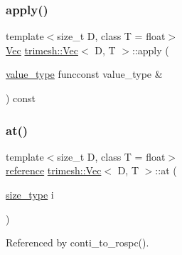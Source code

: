 \mbox{\label{classtrimesh_1_1Vec_ab0c9934c8f265e9a70064eecb09b7951}} 
\subsubsection{\texorpdfstring{apply()}{apply()}\hspace{0.1cm}{\footnotesize\ttfamily [2/2]}}
{\footnotesize\ttfamily template$<$size\+\_\+t D, class T = float$>$ \\
\hyperlink{classtrimesh_1_1Vec}{Vec} \hyperlink{classtrimesh_1_1Vec}{trimesh\+::\+Vec}$<$ D, T $>$\+::apply (\begin{DoxyParamCaption}\item[{\hyperlink{classtrimesh_1_1Vec_a10a59253996e42d67c713f37592669df}{value\+\_\+type} }]{funcconst value\+\_\+type \& }\end{DoxyParamCaption}) const\hspace{0.3cm}{\ttfamily [inline]}}

\mbox{\label{classtrimesh_1_1Vec_a51378784c1e7f96e6ce170620ccaacc6}} 
\subsubsection{\texorpdfstring{at()}{at()}\hspace{0.1cm}{\footnotesize\ttfamily [1/2]}}
{\footnotesize\ttfamily template$<$size\+\_\+t D, class T = float$>$ \\
\hyperlink{classtrimesh_1_1Vec_ad76bb92c986524d251998d6eae7d2825}{reference} \hyperlink{classtrimesh_1_1Vec}{trimesh\+::\+Vec}$<$ D, T $>$\+::at (\begin{DoxyParamCaption}\item[{\hyperlink{classtrimesh_1_1Vec_a65397e05ed96e7723cf2d54dfff0ad0a}{size\+\_\+type}}]{i }\end{DoxyParamCaption})\hspace{0.3cm}{\ttfamily [inline]}}



Referenced by conti\+\_\+to\+\_\+rospc().

\mbox{\label{classtrimesh_1_1Vec_a405cc6bbca69a428ce2be45f77ab1123}} 
